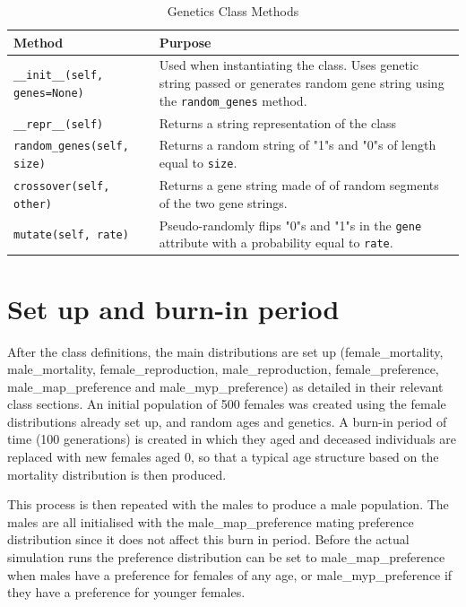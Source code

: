 \documentclass[authoryearcitations]{UoYCSproject}
\begin{document}
\begin{table}[h]
\caption{Genetics Class Methods}
\label{tbl:geneticsMethods}
\begin{tabular}{m{} m{}}
\textbf{Method} & \textbf{Purpose} \\\hline
\texttt{\_\_init\_\_(self, genes=None)} & Used when instantiating the class. Uses genetic string passed or generates random gene string using the \texttt{random\_genes} method.\\\hline
\texttt{\_\_repr\_\_(self)} & Returns a string representation of the class \\\hline
\texttt{random\_genes(self, size)} & Returns a random string of "1"s and "0"s of length equal to \texttt{size}. \\\hline
\texttt{crossover(self, other)} & Returns a gene string made of of random segments of the two gene strings. \\\hline
\texttt{mutate(self, rate)} & Pseudo-randomly flips "0"s and "1"s in the \texttt{gene} attribute with a probability equal to \texttt{rate}.
\end{tabular}
\end{table}

\section{Set up and burn-in period}
After the class definitions, the main distributions are set up (female\_mortality, male\_mortality, female\_reproduction, male\_reproduction, female\_preference, male\_map\_preference and male\_myp\_preference) as detailed in their relevant class sections. An initial population of 500 females was created using the female distributions already set up, and random ages and genetics. A burn-in period of time (100 generations) is created in which they aged and deceased individuals are replaced with new females aged 0, so that a typical age structure based on the mortality distribution is then produced. 

This process is then repeated with the males to produce a male population. The males are all initialised with the male\_map\_preference mating preference distribution since it does not affect this burn in period. Before the actual simulation runs the preference distribution can be set to male\_map\_preference when males have a preference for females of any age, or male\_myp\_preference if they have a preference for younger females. 
\end{document}
